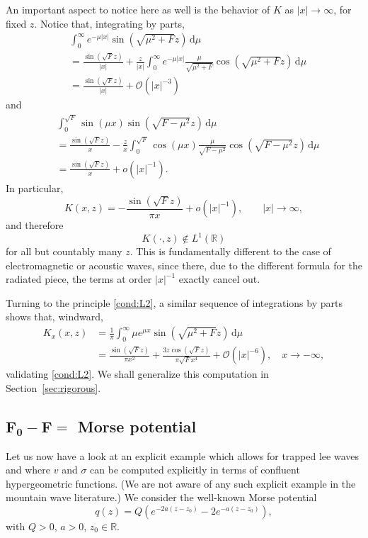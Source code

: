 \documentclass[11pt,twoside,reqno,centertags]{amsart}
\theoremstyle{definition}
\newcommand{\R}{\mathbb R}
\newcommand{\dd}{\mathrm d}
\begin{document}
An important aspect to notice here as well is the behavior of $K$ as $|x|\to\infty$, for fixed $z$. Notice that, integrating by parts,
\begin{align*}
	&\int_0^\infty e^{-\mu|x|}\sin(\sqrt{\mu^2+F}z)\,\dd\mu\\
	&=\frac{\sin(\sqrt{F} z)}{|x|}+\frac{z}{|x|}\int_0^\infty e^{-\mu|x|}\frac{\mu}{\sqrt{\mu^2+F}}\cos(\sqrt{\mu^2+F}z)\,\dd\mu\\
	&=\frac{\sin(\sqrt{F} z)}{|x|}+\mathcal O(|x|^{-3})
\end{align*}
and
\begin{align*}
	&\int_0^{\sqrt F}\sin(\mu x)\sin(\sqrt{F-\mu^2}z)\,\dd\mu\\
	&=\frac{\sin(\sqrt{F} z)}{x}-\frac{z}{x}\int_0^{\sqrt F}\cos(\mu x)\frac{\mu}{\sqrt{F-\mu^2}}\cos(\sqrt{F-\mu^2}z)\,\dd\mu\\
	&=\frac{\sin(\sqrt{F} z)}{x}+o(|x|^{-1}).
\end{align*}
In particular,
\[K(x,z)=-\frac{\sin(\sqrt{F} z)}{\pi x}+o(|x|^{-1}),\qquad |x|\to\infty,\]
and therefore
\[K(\cdot,z) \notin L^1(\R)\]
for all but countably many $z$. This is fundamentally different to the case of electromagnetic or acoustic waves, since there, due to the different formula for the radiated piece, the terms at order $|x|^{-1}$ exactly cancel out.

Turning to the principle \ref{cond:L2}, a similar sequence of integrations by parts shows that, windward,
\begin{align}
	K_x(x,z) &= \frac1\pi \int_0^\infty \mu e^{\mu x} \sin(\sqrt{\mu^2+F}z) \, \dd\mu \nonumber\\
	&= \frac{\sin(\sqrt{F} z)}{\pi x^2} + \frac{3z\cos(\sqrt{F}z)}{\pi\sqrt{F}x^4} + \mathcal O(|x|^{-6}),\quad x\to-\infty,\label{eq:Kx_asymptotics_F=const}
\end{align}
validating \ref{cond:L2}. We shall generalize this computation in Section~\ref{sec:rigorous}.

\subsection{\texorpdfstring{$\mathbf{F_0-F}=$ Morse potential}{F0 - F = Morse potential}}
Let us now have a look at an explicit example which allows for trapped lee waves and where $v$ and $\sigma$ can be computed explicitly in terms of confluent hypergeometric functions. (We are not aware of any such explicit example in the mountain wave literature.) We consider the well-known Morse potential \cite{Morse1929}
\begin{equation}\label{eq:Morse_potential}
	q(z) = Q\left(e^{-2a(z-z_0)} - 2e^{-a(z-z_0)}\right),
\end{equation}
with $Q>0$, $a>0$, $z_0\in\R$.
\end{document}
